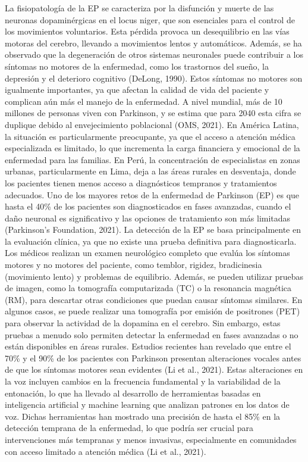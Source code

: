 \documentclass[listof=nochaptergap,12pt,times,authoryear]{report}
\begin{document}
La fisiopatología de la EP se caracteriza por la disfunción y muerte de las neuronas dopaminérgicas en el locus niger, que son esenciales para el control de los movimientos voluntarios. Esta pérdida provoca un desequilibrio en las vías motoras del cerebro, llevando a movimientos lentos y automáticos. Además, se ha observado que la degeneración de otros sistemas neuronales puede contribuir a los síntomas no motores de la enfermedad, como los trastornos del sueño, la depresión y el deterioro cognitivo (DeLong, 1990). Estos síntomas no motores son igualmente importantes, ya que afectan la calidad de vida del paciente y complican aún más el manejo de la enfermedad.
A nivel mundial, más de 10 millones de personas viven con Parkinson, y se estima que para 2040 esta cifra se duplique debido al envejecimiento poblacional (OMS, 2021). En América Latina, la situación es particularmente preocupante, ya que el acceso a atención médica especializada es limitado, lo que incrementa la carga financiera y emocional de la enfermedad para las familias. En Perú, la concentración de especialistas en zonas urbanas, particularmente en Lima, deja a las áreas rurales en desventaja, donde los pacientes tienen menos acceso a diagnósticos tempranos y tratamientos adecuados.
Uno de los mayores retos de la enfermedad de Parkinson (EP) es que hasta el 40\% de los pacientes son diagnosticados en fases avanzadas, cuando el daño neuronal es significativo y las opciones de tratamiento son más limitadas (Parkinson’s Foundation, 2021). La detección de la EP se basa principalmente en la evaluación clínica, ya que no existe una prueba definitiva para diagnosticarla. Los médicos realizan un examen neurológico completo que evalúa los síntomas motores y no motores del paciente, como temblor, rigidez, bradicinesia (movimiento lento) y problemas de equilibrio. Además, se pueden utilizar pruebas de imagen, como la tomografía computarizada (TC) o la resonancia magnética (RM), para descartar otras condiciones que puedan causar síntomas similares. En algunos casos, se puede realizar una tomografía por emisión de positrones (PET) para observar la actividad de la dopamina en el cerebro. Sin embargo, estas pruebas a menudo solo permiten detectar la enfermedad en fases avanzadas o no están disponibles en áreas rurales.
Estudios recientes han revelado que entre el 70\% y el 90\% de los pacientes con Parkinson presentan alteraciones vocales antes de que los síntomas motores sean evidentes (Li et al., 2021). Estas alteraciones en la voz incluyen cambios en la frecuencia fundamental y la variabilidad de la entonación, lo que ha llevado al desarrollo de herramientas basadas en inteligencia artificial y machine learning que analizan patrones en los datos de voz. Dichas herramientas han mostrado una precisión de hasta el 85\% en la detección temprana de la enfermedad, lo que podría ser crucial para intervenciones más tempranas y menos invasivas, especialmente en comunidades con acceso limitado a atención médica (Li et al., 2021).
\end{document}
